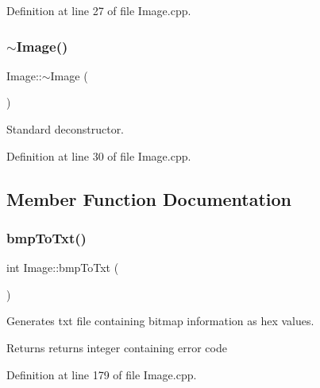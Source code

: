 Definition at line 27 of file Image.\+cpp.

\mbox{\label{classImage_a0294f63700543e11c0f0da85601c7ae5}} 
\subsubsection{\texorpdfstring{$\sim$Image()}{~Image()}}
{\footnotesize\ttfamily Image\+::$\sim$\+Image (\begin{DoxyParamCaption}{ }\end{DoxyParamCaption})\hspace{0.3cm}{\ttfamily [virtual]}}

Standard deconstructor. 

Definition at line 30 of file Image.\+cpp.



\subsection{Member Function Documentation}
\mbox{\label{classImage_aa16c9acd068079c676dec4186262b1b7}} 
\subsubsection{\texorpdfstring{bmpToTxt()}{bmpToTxt()}}
{\footnotesize\ttfamily int Image\+::bmp\+To\+Txt (\begin{DoxyParamCaption}{ }\end{DoxyParamCaption})}



Generates txt file containing bitmap information as hex values. 

\begin{DoxyReturn}{Returns}
returns integer containing error code 
\end{DoxyReturn}


Definition at line 179 of file Image.\+cpp.

